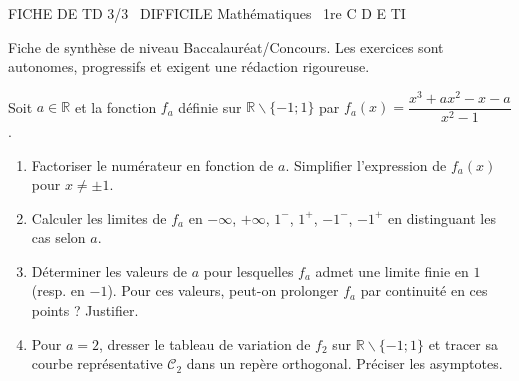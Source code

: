 \documentclass[11pt]{article}
\def\setminus{\mathbin{\backslash}}\let\smallsetminus\setminus
\begin{document}
\begin{tcolorbox}[enhanced,colback=popink,colframe=popink,arc=10pt,boxrule=0pt,left=12pt,right=12pt,top=9pt,bottom=9pt]
{\color{white}\popxbold\small FICHE DE TD 3/3 \textbullet\ DIFFICILE \hfill Mathématiques \textbullet\ 1re C D E TI\par}
\end{tcolorbox}
\vspace{4pt}
Fiche de synthèse de niveau Baccalauréat/Concours. Les exercices sont autonomes, progressifs et exigent une rédaction rigoureuse.

\begin{exercice}
Soit $a \in \mathbb{R}$ et la fonction $f_a$ définie sur $\mathbb{R} \setminus \{-1; 1\}$ par $f_a(x) = \dfrac{x^3 + ax^2 - x - a}{x^2 - 1}$.
\begin{enumerate}
    \item Factoriser le numérateur en fonction de $a$. Simplifier l'expression de $f_a(x)$ pour $x \neq \pm 1$.
    \item Calculer les limites de $f_a$ en $-\infty$, $+\infty$, $1^-$, $1^+$, $-1^-$, $-1^+$ en distinguant les cas selon $a$.
    \item Déterminer les valeurs de $a$ pour lesquelles $f_a$ admet une limite finie en $1$ (resp. en $-1$). Pour ces valeurs, peut-on prolonger $f_a$ par continuité en ces points ? Justifier.
    \item Pour $a = 2$, dresser le tableau de variation de $f_2$ sur $\mathbb{R} \setminus \{-1; 1\}$ et tracer sa courbe représentative $\mathcal{C}_2$ dans un repère orthogonal. Préciser les asymptotes.
\end{enumerate}
\end{exercice}
\end{document}
